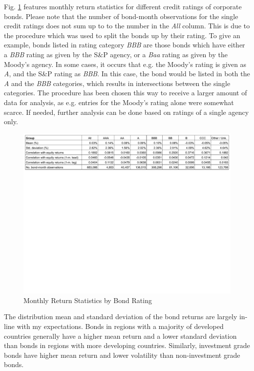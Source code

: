 Fig. \ref{fig:summary-stats-by-rating} features monthly return statistics for different credit ratings of corporate bonds. Please note that the number of bond-month observations for the single credit ratings does not sum up to to the number in the \textit{All} column. This is due to the procedure which was used to split the bonds up by their rating. To give an example, bonds listed in rating category \textit{BBB} are those bonds which have either a \textit{BBB} rating as given by the S\&P agency, or a \textit{Baa} rating as given by the Moody's agency. In some cases, it occurs that e.g. the Moody's rating is given as \textit{A}, and the S\&P rating as \textit{BBB}. In this case, the bond would be listed in both the \textit{A} and the \textit{BBB} categories, which results in intersections between the single categories. The procedure has been chosen this way to receive a larger amount of data for analysis, as e.g. entries for the Moody's rating alone were somewhat scarce. If needed, further analysis can be done based on ratings of a single agency only. 

\begin{figure}[h]
	\centering
	\includegraphics[trim={0 16cm 0 0},clip,width=1.0\linewidth]{figures/summary-stats-by-rating.pdf}
	\caption{Monthly Return Statistics by Bond Rating}
	\label{fig:summary-stats-by-rating}
\end{figure}

The distribution mean and standard deviation of the bond returns are largely in-line with my expectations. Bonds in regions with a majority of developed countries generally have a higher mean return and a lower standard deviation than bonds in regions with more developing countries. Similarly, investment grade bonds have higher mean return and lower volatility than non-investment grade bonds. 

